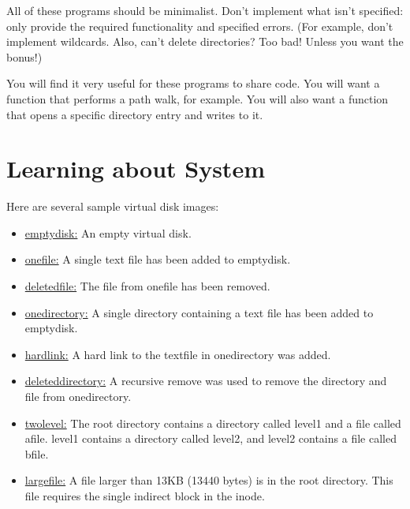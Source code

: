 \documentclass[12pt]{article}
\begin{document}
All of these programs should be minimalist. Don't implement what isn't specified:
only provide the required functionality and specified errors. (For example, don't
implement wildcards. Also, can't delete directories? Too bad! Unless you want the
bonus!)

\bigskip

You will find it very useful for these programs to share code. You will want a
function that performs a path walk, for example. You will also want a function
that opens a specific directory entry and writes to it.


\bigskip

\section{Learning about System}

\bigskip

Here are several sample virtual disk images:

\bigskip

\begin{itemize}
    \item \href{https://www.teach.cs.toronto.edu//~csc369h/summer/assignments/new-a3/images/emptydisk.img}{emptydisk:} An empty virtual disk.
    \item \href{https://www.teach.cs.toronto.edu//~csc369h/summer/assignments/new-a3/images/onefile.img}{onefile:} A single text file has been added to emptydisk.
    \item \href{https://www.teach.cs.toronto.edu//~csc369h/summer/assignments/new-a3/images/deletedfile.img}{deletedfile:} The file from onefile has been removed.
    \item \href{https://www.teach.cs.toronto.edu//~csc369h/summer/assignments/new-a3/images/hardlink.img}{onedirectory:} A single directory containing a text file has been added to emptydisk.
    \item \href{https://www.teach.cs.toronto.edu//~csc369h/summer/assignments/new-a3/images/hardlink.img}{hardlink:} A hard link to the textfile in onedirectory was added.
    \item \href{https://www.teach.cs.toronto.edu//~csc369h/summer/assignments/new-a3/images/deleteddirectory.img}{deleteddirectory:} A recursive remove was used to remove the directory and file from onedirectory.
    \item \href{https://www.teach.cs.toronto.edu//~csc369h/summer/assignments/new-a3/images/twolevel.img}{twolevel:} The root directory contains a directory called level1 and a file called afile. level1 contains a directory called level2, and level2 contains a file called bfile.
    \item \href{https://www.teach.cs.toronto.edu//~csc369h/summer/assignments/new-a3/images/largefile.img}{largefile:} A file larger than 13KB (13440 bytes) is in the root directory. This file requires the single indirect block in the inode.
\end{itemize}
\end{document}
